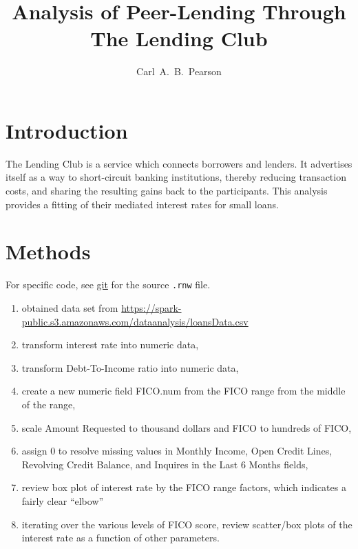 \documentclass{article}
\begin{document}


\title{Analysis of Peer-Lending Through The Lending Club}
\author{Carl~A.~B.~Pearson}
\maketitle
\section*{Introduction}
The Lending Club\cite{lending} is a service which connects borrowers and lenders.  It advertises itself as a way to short-circuit banking institutions, thereby reducing transaction costs, and sharing the resulting gains back to the participants.  This analysis provides a fitting of their mediated interest rates for small loans.

\section{Methods}
For specific code, see \href{git}{git} for the source \texttt{.rnw} file.
\begin{enumerate}
\item obtained data set from \href{https://spark-public.s3.amazonaws.com/dataanalysis/loansData.csv}{https://spark-public.s3.amazonaws.com/dataanalysis/loansData.csv}
\item transform interest rate into numeric data,
\item transform Debt-To-Income ratio into numeric data,
\item create a new numeric field FICO.num from the FICO\cite{wikiFICO} range from the middle of the range,
\item scale Amount Requested to thousand dollars and FICO to hundreds of FICO,
\item assign 0 to resolve missing values in Monthly Income, Open Credit Lines, Revolving Credit Balance, and Inquires in the Last 6 Months fields,
\item review box plot of interest rate by the FICO range factors, which indicates a fairly clear ``elbow''
\item iterating over the various levels of FICO score, review scatter/box plots of the interest rate as a function of other parameters.
\end{enumerate}
\end{document}
